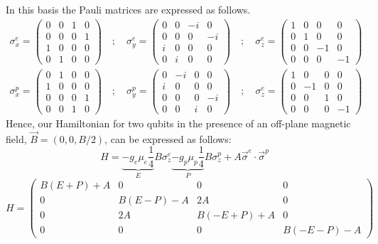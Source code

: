 In this basis the Pauli matrices are expressed as follows.
\begin{equation}
  \begin{split}
    \sigma^e_x=\left(\begin{array}{cccc}
    0 & 0 & 1 & 0 \\
    0 & 0 & 0 & 1 \\
    1 & 0 & 0 & 0 \\
    0 & 1 & 0 & 0
    \end{array}\right)\quad;\quad
    \sigma^e_y=\left(\begin{array}{cccc}
    0 & 0 & -i & 0 \\
    0 & 0 & 0 & -i \\
    i & 0 & 0 & 0 \\
    0 & i & 0 & 0
    \end{array}\right)\quad;\quad
    \sigma^e_z=\left(\begin{array}{cccc}
    1 & 0 & 0 & 0 \\
    0 & 1 & 0 & 0 \\
    0 & 0 & -1 & 0 \\
    0 & 0 & 0 & -1
    \end{array}\right)\\
    \sigma^p_x=\left(\begin{array}{cccc}
    0 & 1 & 0 & 0 \\
    1 & 0 & 0 & 0 \\
    0 & 0 & 0 & 1 \\
    0 & 0 & 1 & 0
    \end{array}\right)\quad;\quad
    \sigma^p_y=\left(\begin{array}{cccc}
    0 & -i & 0 & 0 \\
    i & 0 & 0 & 0 \\
    0 & 0 & 0 & -i \\
    0 & 0 & i & 0
    \end{array}\right)\quad;\quad
    \sigma^e_z=\left(\begin{array}{cccc}
    1 & 0 & 0 & 0 \\
    0 & -1 & 0 & 0 \\
    0 & 0 & 1 & 0 \\
    0 & 0 & 0 & -1
    \end{array}\right)
  \end{split}
\end{equation}
Hence, our Hamiltonian for two qubits in the presence of an off-plane magnetic field, $\vec{B}=(0,0,B/2)$, can be expressed as follows:
\begin{equation*}
H = \underbrace{-g_e\mu_e\frac{1}{4}}_{E}B\sigma^e_z
    \underbrace{-g_p\mu_p\frac{1}{4}}_{P}B\sigma^p_z
    +A\vec{\sigma}^e\cdot\vec{\sigma}^p
\end{equation*}
\begin{equation}
  H = \left(\begin{array}{cccc}
  B(E+P)+A & 0 & 0 & 0 \\
  0 & B(E-P)-A & 2A & 0 \\
  0 & 2A & B(-E+P)+A & 0 \\
  0 & 0 & 0 & B(-E-P)-A
  \end{array}\right)
\end{equation}

